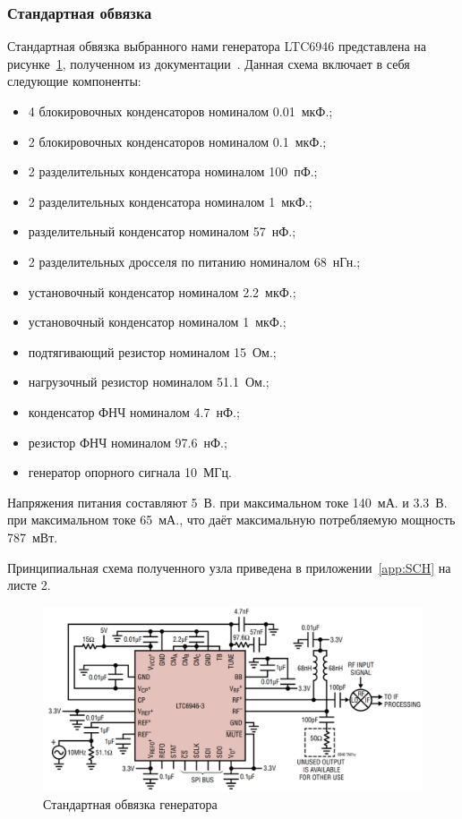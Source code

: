 \documentclass[utf8x, 14pt, oneside, a4paper]{article}
\begin{document}
			\subsubsection{Стандартная обвязка}
				Стандартная обвязка выбранного нами генератора LTC6946 представлена на рисунке~\ref{fig:обвязка:Генератор}, полученном из документации~\cite{bib:Генератор}. Данная схема включает в себя следующие компоненты:
				\begin{itemize}
					\item 4 блокировочных конденсаторов номиналом 0.01~мкФ.;
					\item 2 блокировочных конденсаторов номиналом 0.1~мкФ.;
					\item 2 разделительных конденсатора номиналом 100~пФ.;
					\item 2 разделительных конденсатора номиналом 1~мкФ.;
					\item разделительный конденсатор номиналом 57~нФ.;
					\item 2 разделительных дросселя по питанию номиналом 68~нГн.;
					\item установочный конденсатор номиналом 2.2~мкФ.;
					\item установочный конденсатор номиналом 1~мкФ.;
					\item подтягивающий резистор номиналом 15~Ом.;
					\item нагрузочный резистор номиналом 51.1~Ом.;
					\item конденсатор ФНЧ номиналом 4.7~нФ.;
					\item резистор ФНЧ номиналом 97.6~нФ.;
					\item генератор опорного сигнала 10~МГц.
					
				\end{itemize}
			
				Напряжения питания составляют 5~В. при максимальном токе 140~мА. и 3.3~В. при максимальном токе 65~мА., что даёт максимальную потребляемую мощность 787~мВт.
				
				Принципиальная схема полученного узла приведена в приложении~\ref{app:SCH} на листе 2.
				\begin{figure}[h!]
					\centering
					\includegraphics[width=0.7\linewidth]{"Обвязка генератора"}
					\caption{Стандартная обвязка генератора}
					\label{fig:обвязка:Генератор}
				\end{figure}
			
\end{document}
